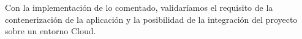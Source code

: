 Con la implementación de lo comentado, validaríamos el requisito de la
contenerización de la aplicación y la posibilidad de la integración del
proyecto sobre un entorno Cloud.




